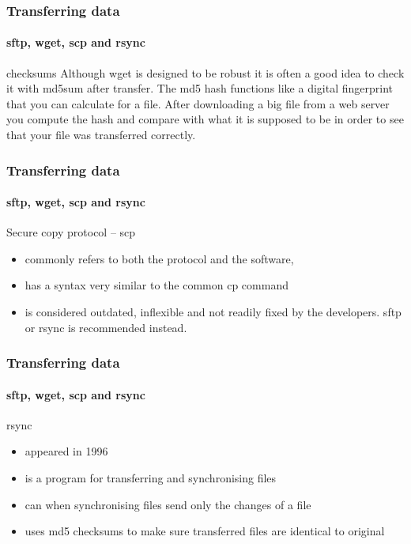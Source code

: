 \documentclass[aspectratio=169,dvipsnames]{beamer}
\begin{document}
    \begin{frame}
        \frametitle{Transferring data}
        \framesubtitle{sftp, wget, scp and rsync}
        \begin{block}{checksums}
            Although wget is designed to be robust it is often a good idea to
            check it with md5sum after transfer. The md5 hash functions like 
            a digital fingerprint that you can calculate for a file. After
            downloading a big file from a web server you \alert{compute the hash and
            compare with what it is supposed to be} in order to see that your
            file was transferred correctly.
        \end{block}
    \end{frame}
    \begin{frame}
        \frametitle{Transferring data}
        \framesubtitle{sftp, wget, scp and rsync}
        \begin{block}{Secure copy protocol -- scp}
        \begin{itemize}
            \item commonly refers to both the protocol and the software,
            \item has a \alert{syntax very similar to the common cp command}
            \item is considered \alert{outdated, inflexible} and not readily fixed by
            the developers. sftp or rsync is recommended instead.
        \end{itemize}
        \end{block}
    \end{frame}
    \begin{frame}
        \frametitle{Transferring data}
        \framesubtitle{sftp, wget, scp and rsync}
        \begin{block}{rsync}
        \begin{itemize}
            \item appeared in 1996
            \item is a program for \alert{transferring} and \alert{synchronising} files
            \item can when synchronising files \alert{send only the changes} of a file 
            \item \alert{uses md5 checksums} to make sure transferred files are identical to original
        \end{itemize}
        \end{block}
    \end{frame}
\end{document}
